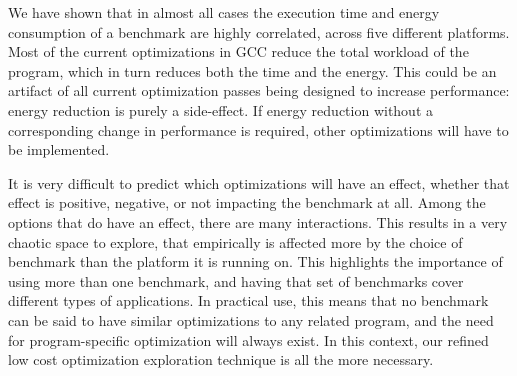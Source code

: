 \documentclass[twocolumn]{article}
\begin{document}
We have shown that in almost all cases the execution time and energy consumption of a benchmark are highly correlated, across five different platforms. Most of the current optimizations in GCC reduce the total workload of the program, which in turn reduces both the time and the energy. This could be an artifact of all current optimization passes being designed to increase performance: energy reduction is purely a side-effect. If energy reduction without a corresponding change in performance is required, other optimizations will have to be implemented.

It is very difficult to predict which optimizations will have an effect, whether that effect is positive, negative, or not impacting the benchmark at all. Among the options that do have an effect, there are many interactions. This results in a very chaotic space to explore, that empirically is affected more by the choice of benchmark than the platform it is running on. This highlights the importance of using more than one benchmark, and having that set of benchmarks cover different types of applications. In practical use, this means that no benchmark can be said to have similar optimizations to any related program, and the need for program-specific optimization will always exist. In this context, our refined low cost optimization exploration technique is all the more necessary.

\printbibliography
\end{document}
